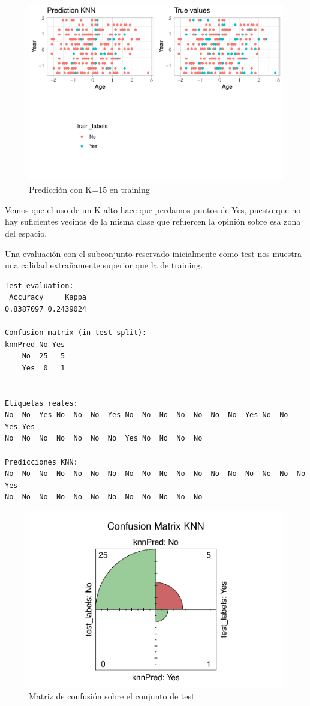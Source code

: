 \begin{figure}[H]\center\includegraphics[width=.9\linewidth]{img/Clasificacion_files/figure-latex/unnamed-chunk-10-1}\caption{Predicción con K=15 en training}\end{figure}

Vemos que el uso de un K alto hace que perdamos puntos de Yes, puesto que no hay suficientes vecinos de la misma clase que refuercen la opinión sobre esa zona del espacio.

\vspace{\baselineskip}

Una evaluación con el subconjunto reservado inicialmente como test nos muestra una calidad extrañamente superior que la de training.

\begin{verbatim}
Test evaluation:
 Accuracy     Kappa 
0.8387097 0.2439024 

Confusion matrix (in test split):
knnPred No Yes
    No  25   5
    Yes  0   1


Etiquetas reales:
No  No  Yes No  No  No  Yes No  No  No  No  No  No  No  Yes No  No  Yes Yes
No  No  No  No  No  No  No  Yes No  No  No  No 

Predicciones KNN:
No  No  No  No  No  No  No  No  No  No  No  No  No  No  No  No  No  No  Yes
No  No  No  No  No  No  No  No  No  No  No  No 
\end{verbatim}

\begin{figure}[H]\center\includegraphics[width=.9\linewidth]{img/Clasificacion_files/figure-latex/unnamed-chunk-9-1}\caption{Matriz de confusión sobre el conjunto de test}\end{figure}

